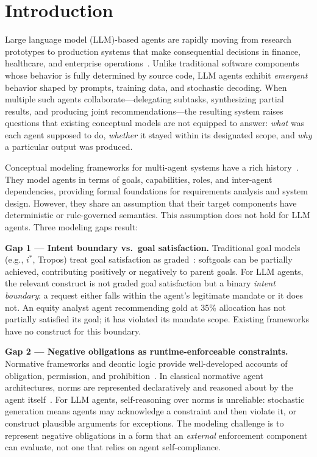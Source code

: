 \documentclass[runningheads]{llncs}
\begin{document}
\section{Introduction}
\label{sec:introduction}

Large language model (LLM)-based agents are rapidly moving from research
prototypes to production systems that make consequential decisions in
finance, healthcare, and enterprise
operations~\cite{wang2024survey,xi2023rise}. Unlike traditional software
components whose behavior is fully determined by source code, LLM agents
exhibit \emph{emergent} behavior shaped by prompts, training data, and
stochastic decoding. When multiple such agents collaborate---delegating
subtasks, synthesizing partial results, and producing joint
recommendations---the resulting system raises questions that existing
conceptual models are not equipped to answer: \emph{what} was each agent
supposed to do, \emph{whether} it stayed within its designated scope, and
\emph{why} a particular output was produced.

Conceptual modeling frameworks for multi-agent systems have a rich
history~\cite{yu2011social,bresciani2004tropos,wooldridge2000gaia}.
They model agents in terms of goals, capabilities, roles, and
inter-agent dependencies, providing formal foundations for requirements
analysis and system design. However, they share an assumption that their
target components have deterministic or rule-governed semantics. This
assumption does not hold for LLM agents. Three modeling gaps result:

\textbf{Gap 1 — Intent boundary vs.\ goal satisfaction.} Traditional
goal models (e.g., $i^*$, Tropos) treat goal satisfaction as
graded~\cite{yu2011social}: softgoals can be partially achieved,
contributing positively or negatively to parent goals. For LLM agents,
the relevant construct is not graded goal satisfaction but a binary
\emph{intent boundary}: a request either falls within the agent's
legitimate mandate or it does not. An equity analyst agent recommending
gold at 35\% allocation has not partially satisfied its goal; it has
violated its mandate scope. Existing frameworks have no construct for
this boundary.

\textbf{Gap 2 — Negative obligations as runtime-enforceable constraints.}
Normative frameworks and deontic logic provide well-developed accounts
of obligation, permission, and
prohibition~\cite{vonwright1951essay,governatori2005meeting,
boella2006introduction}. In classical normative agent architectures,
norms are represented declaratively and reasoned about by the agent
itself~\cite{dignum1999autonomous}. For LLM agents, self-reasoning over
norms is unreliable: stochastic generation means agents may acknowledge
a constraint and then violate it, or construct plausible arguments for
exceptions. The modeling challenge is to represent negative obligations
in a form that an \emph{external} enforcement component can evaluate,
not one that relies on agent self-compliance.
\end{document}

